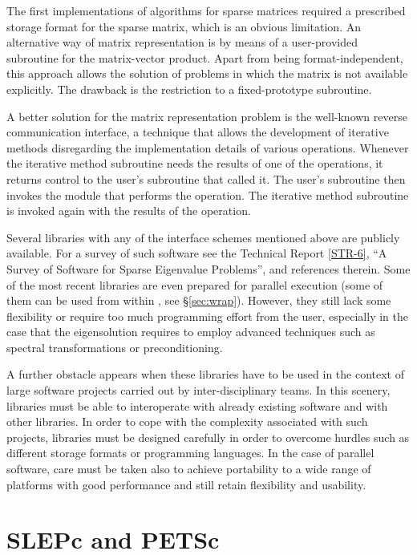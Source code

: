 	The first implementations of algorithms for sparse matrices required a prescribed storage format for the sparse matrix, which is an obvious limitation. An alternative way of matrix representation is by means of a user-provided subroutine for the matrix-vector product. Apart from being format-independent, this approach allows the solution of problems in which the matrix is not available explicitly. The drawback is the restriction to a fixed-prototype subroutine.

	A better solution for the matrix representation problem is the well-known reverse communication interface, a technique that allows the development of iterative methods disregarding the implementation details of various operations. Whenever the iterative method subroutine needs the results of one of the operations, it returns control to the user's subroutine that called it. The user's subroutine then invokes the module that performs the operation. The iterative method subroutine is invoked again with the results of the operation.

	Several libraries with any of the interface schemes mentioned above are publicly available. For a survey of such software see the \slepc Technical Report \hyperlink{str}{[STR-6]}, ``A Survey of Software for Sparse Eigenvalue Problems'', and references therein. Some of the most recent libraries are even prepared for parallel execution (some of them can be used from within \slepc, see \S\ref{sec:wrap}). However, they still lack some flexibility or require too much programming effort from the user, especially in the case that the eigensolution requires to employ advanced techniques such as spectral transformations or preconditioning.

	A further obstacle appears when these libraries have to be used in the context of large software projects carried out by inter-disciplinary teams. In this scenery, libraries must be able to interoperate with already existing software and with other libraries. In order to cope with the complexity associated with such projects, libraries must be designed carefully in order to overcome hurdles such as different storage formats or programming languages. In the case of parallel software, care must be taken also to achieve portability to a wide range of platforms with good performance and still retain flexibility and usability.

\section{SLEPc and PETSc}

